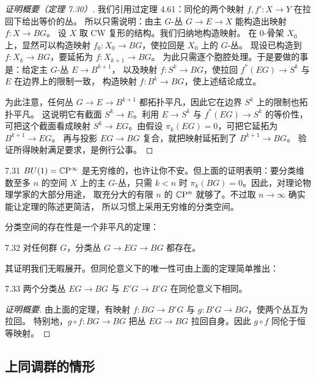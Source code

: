 \begin{proof}[证明概要（定理 7.30）]
我们引用过定理 4.61：同伦的两个映射 $f,f':X\to Y$ 在拉回下给出等价的丛。
所以只需说明：由主 $G$-丛 $G\to E\to X$ 能构造出映射 $f:X\to BG$。
设 $X$ 取 CW 复形的结构。我们归纳地构造映射。
在 $0$-骨架 $X_0$ 上，显然可以构造映射 $f_0:X_0\to BG$，使拉回是 $X_0$ 上的 $G$-丛。
现设已构造到 $f:X_k\to BG$，要延拓为 $f:X_{k+1}\to BG$。
为此只需逐个胞腔处理。于是要做的事是：给定主 $G$-丛 $E\to B^{k+1}$，
以及映射 $f:S^k\to BG$，使拉回 $f^*(EG)\to S^k$ 与 $E$ 在边界上的限制一致，
构造映射 $f:B^k\to BG$，使上述结论成立。

为此注意，任何丛 $G\to E\to B^{k+1}$ 都拓扑平凡，因此它在边界 $S^k$ 上的限制也拓扑平凡。
这说明它有截面 $S^k\to E$。利用 $E\to S^k$ 与 $f^*(EG)\to S^k$ 的等价性，
可把这个截面看成映射 $S^k\to EG$。由假设 $\pi_k(EG)=0$，可把它延拓为 $B^{k+1}\to EG$。
再与投影 $EG\to BG$ 复合，就把映射延拓到了 $B^{k+1}\to BG$。
验证所得映射满足要求，是例行公事。
\end{proof}

\begin{remark}{7.31}
$BU(1)=\mathbb{C}\mathrm{P}^\infty$ 是无穷维的，也许让你不安。但上面的证明表明：要分类维数至多 $n$ 的空间 $X$
上的主 $G$-丛，只需 $k<n$ 时 $\pi_k(BG)=0$。因此，对理论物理学家的大部分用途，
取充分大的有限 $n$ 的 $\mathbb{C}\mathrm{P}^n$ 就够了。不过取 $n\to\infty$ 确实能让定理的陈述更简洁，
所以习惯上采用无穷维的分类空间。
\end{remark}

分类空间的存在性是一个非平凡的定理：

\begin{theorem}{7.32}
对任何群 $G$，分类丛 $G\to EG\to BG$ 都存在。
\end{theorem}

其证明我们无暇展开。但同伦意义下的唯一性可由上面的定理简单推出：

\begin{proposition}{7.33}
两个分类丛 $EG\to BG$ 与 $E'G\to B'G$ 在同伦意义下相同。
\end{proposition}

\begin{proof}[证明概要]
由上面的定理，有映射 $f:BG\to B'G$ 与 $g:B'G\to BG$，使两个丛互为拉回。
特别地，$g\circ f:BG\to BG$ 把丛 $EG\to BG$ 拉回自身。因此 $g\circ f$ 同伦于恒等映射。
\end{proof}

\subsection{上同调群的情形}

